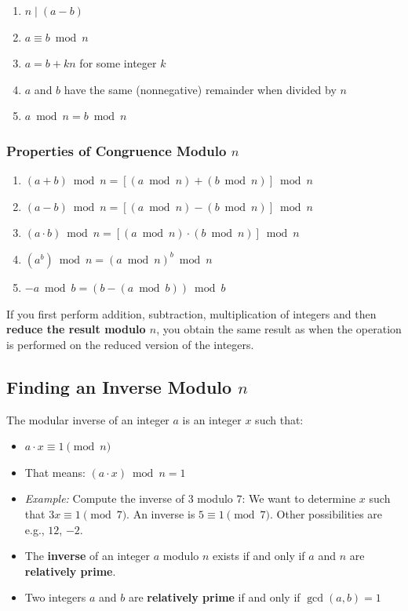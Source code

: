 \begin{enumerate}
  \item $n \mid (a-b)$
  \item $a \equiv b \bmod{n}$
  \item $a = b + kn$ for some integer $k$
  \item $a$ and $b$ have the same (nonnegative) remainder when divided by $n$
  \item $a \bmod n = b \bmod{n}$
\end{enumerate}

\subsubsection{Properties of Congruence Modulo \texorpdfstring{$n$}{n}}
\begin{enumerate}
  \item $(a+b) \bmod n = [(a \bmod n) + (b \bmod n)] \bmod n$
  \item $(a-b) \bmod n = [(a \bmod n) - (b \bmod n)] \bmod n$
  \item $(a \cdot b) \bmod n = [(a \bmod n) \cdot (b \bmod n)] \bmod n$
  \item $(a^{b}) \bmod n = (a \bmod n)^{b} \bmod n$
  \item $-a \bmod b = (b - (a \bmod b)) \bmod b$
\end{enumerate}

If you first perform addition, subtraction, multiplication of integers and then \textbf{reduce the result modulo $n$}, you obtain the same result as when the operation is performed on the reduced version of the integers.

\subsection{Finding an Inverse Modulo \texorpdfstring{$n$}{n}}
The modular inverse of an integer $a$ is an integer $x$ such that:

\begin{itemize}
  \item $a \cdot x \equiv 1 \pmod{n}$
  \item That means: $(a \cdot x) \bmod n = 1$
  \item \textit{Example:} Compute the inverse of $3$ modulo $7$: We want to determine $x$ such that $3x \equiv 1 \pmod{7}$. An inverse is $5 \equiv 1 \pmod{7}$. Other possibilities are e.g., $12$, $-2$.
  \item The \textbf{inverse} of an integer $a$ modulo $n$ exists if and only if $a$ and $n$ are \textbf{relatively prime}.
  \item  Two integers $a$ and $b$ are \textbf{relatively prime} if and only if $\gcd(a,b) = 1$
\end{itemize}

